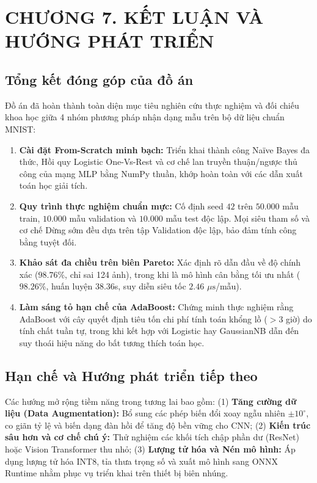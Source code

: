 \section*{CHƯƠNG 7. KẾT LUẬN VÀ HƯỚNG PHÁT TRIỂN}
\setcounter{section}{7}
\setcounter{subsection}{0}

\subsection{Tổng kết đóng góp của đồ án}
Đồ án đã hoàn thành toàn diện mục tiêu nghiên cứu thực nghiệm và đối chiếu khoa học giữa 4 nhóm phương pháp nhận dạng mẫu trên bộ dữ liệu chuẩn MNIST:
\begin{enumerate}
    \item \textbf{Cài đặt From-Scratch minh bạch:} Triển khai thành công Naïve Bayes đa thức, Hồi quy Logistic One-Vs-Rest và cơ chế lan truyền thuận/ngược thủ công của mạng MLP bằng NumPy thuần, khớp hoàn toàn với các dẫn xuất toán học giải tích.
    \item \textbf{Quy trình thực nghiệm chuẩn mực:} Cố định seed $42$ trên $50.000$ mẫu train, $10.000$ mẫu validation và $10.000$ mẫu test độc lập. Mọi siêu tham số và cơ chế Dừng sớm đều dựa trên tập Validation độc lập, bảo đảm tính công bằng tuyệt đối.
    \item \textbf{Khảo sát đa chiều trên biên Pareto:} Xác định rõ  dẫn đầu về độ chính xác ($98.76\%$, chỉ sai 124 ảnh), trong khi  là mô hình cân bằng tối ưu nhất ($98.26\%$, huấn luyện $38.36$s, suy diễn siêu tốc $2.46$ $\mu\text{s}$/mẫu).
    \item \textbf{Làm sáng tỏ hạn chế của AdaBoost:} Chứng minh thực nghiệm rằng AdaBoost với cây quyết định tiêu tốn chi phí tính toán khổng lồ ($> 3$ giờ) do tính chất tuần tự, trong khi kết hợp với Logistic hay GaussianNB dẫn đến suy thoái hiệu năng do bất tương thích toán học.
\end{enumerate}

\subsection{Hạn chế và Hướng phát triển tiếp theo}
Các hướng mở rộng tiềm năng trong tương lai bao gồm:
(1) \textbf{Tăng cường dữ liệu (Data Augmentation):} Bổ sung các phép biến đổi xoay ngẫu nhiên $\pm 10^\circ$, co giãn tỷ lệ và biến dạng đàn hồi để tăng độ bền vững cho CNN;
(2) \textbf{Kiến trúc sâu hơn và cơ chế chú ý:} Thử nghiệm các khối tích chập phần dư (ResNet) hoặc Vision Transformer thu nhỏ;
(3) \textbf{Lượng tử hóa và Nén mô hình:} Áp dụng lượng tử hóa INT8, tỉa thưa trọng số và xuất mô hình sang ONNX Runtime nhằm phục vụ triển khai trên thiết bị biên nhúng.
